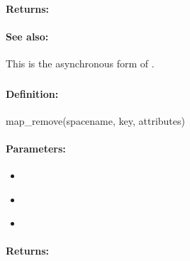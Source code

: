 \paragraph{Returns:}


\paragraph{See also:}  This is the asynchronous form of .

\pagebreak
\subsubsection{}
\label{api:ruby:map_remove}


\paragraph{Definition:}
\begin{rubycode}
map_remove(spacename, key, attributes)
\end{rubycode}

\paragraph{Parameters:}
\begin{itemize}[noitemsep]
\item {}\\

\item {}\\

\item {}\\

\end{itemize}

\paragraph{Returns:}


\pagebreak
\subsubsection{}
\label{api:ruby:async_map_remove}


